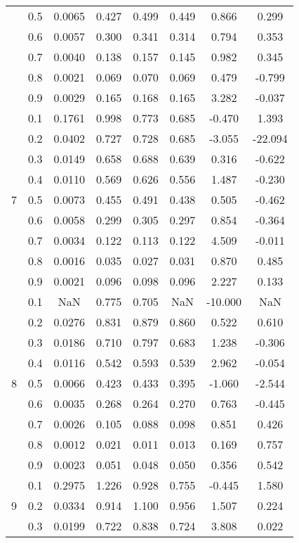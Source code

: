 \documentclass[11pt,a4paper]{report}
\begin{document}
\begin{longtable}{ | c | c || c | c | c | c | c | c | }
 & 0.5 & 0.0065 & 0.427 & 0.499 & 0.449 & 0.866 & 0.299 \\
 & 0.6 & 0.0057 & 0.300 & 0.341 & 0.314 & 0.794 & 0.353 \\
 & 0.7 & 0.0040 & 0.138 & 0.157 & 0.145 & 0.982 & 0.345 \\
 & 0.8 & 0.0021 & 0.069 & 0.070 & 0.069 & 0.479 & -0.799 \\
 & 0.9 & 0.0029 & 0.165 & 0.168 & 0.165 & 3.282 & -0.037 \\
 \hline
\multirow{9}{*}{7} & 0.1 & 0.1761 & 0.998 & 0.773 & 0.685 & -0.470 & 1.393 \\
 & 0.2 & 0.0402 & 0.727 & 0.728 & 0.685 & -3.055 & -22.094 \\
 & 0.3 & 0.0149 & 0.658 & 0.688 & 0.639 & 0.316 & -0.622 \\
 & 0.4 & 0.0110 & 0.569 & 0.626 & 0.556 & 1.487 & -0.230 \\
 & 0.5 & 0.0073 & 0.455 & 0.491 & 0.438 & 0.505 & -0.462 \\
 & 0.6 & 0.0058 & 0.299 & 0.305 & 0.297 & 0.854 & -0.364 \\
 & 0.7 & 0.0034 & 0.122 & 0.113 & 0.122 & 4.509 & -0.011 \\
 & 0.8 & 0.0016 & 0.035 & 0.027 & 0.031 & 0.870 & 0.485 \\
 & 0.9 & 0.0021 & 0.096 & 0.098 & 0.096 & 2.227 & 0.133 \\
 \hline
\multirow{9}{*}{8} & 0.1 & NaN & 0.775 & 0.705 & NaN & -10.000 & NaN \\
 & 0.2 & 0.0276 & 0.831 & 0.879 & 0.860 & 0.522 & 0.610 \\
 & 0.3 & 0.0186 & 0.710 & 0.797 & 0.683 & 1.238 & -0.306 \\
 & 0.4 & 0.0116 & 0.542 & 0.593 & 0.539 & 2.962 & -0.054 \\
 & 0.5 & 0.0066 & 0.423 & 0.433 & 0.395 & -1.060 & -2.544 \\
 & 0.6 & 0.0035 & 0.268 & 0.264 & 0.270 & 0.763 & -0.445 \\
 & 0.7 & 0.0026 & 0.105 & 0.088 & 0.098 & 0.851 & 0.426 \\
 & 0.8 & 0.0012 & 0.021 & 0.011 & 0.013 & 0.169 & 0.757 \\
 & 0.9 & 0.0023 & 0.051 & 0.048 & 0.050 & 0.356 & 0.542 \\
 \hline
\multirow{9}{*}{9} & 0.1 & 0.2975 & 1.226 & 0.928 & 0.755 & -0.445 & 1.580 \\
 & 0.2 & 0.0334 & 0.914 & 1.100 & 0.956 & 1.507 & 0.224 \\
 & 0.3 & 0.0199 & 0.722 & 0.838 & 0.724 & 3.808 & 0.022 \\

\end{longtable}
\end{document}

